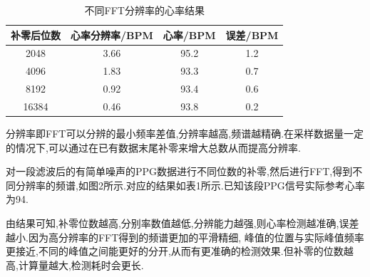 \documentclass[12pt, a4paper, oneside]{ctexart}
\begin{document}
      \begin{table}[!h]
        \renewcommand{\arraystretch}{1.3}
        \caption{不同FFT分辨率的心率结果}
        \centering 
        \begin{tabular}{cccc}
            \toprule
            补零后位数 & 心率分辨率/BPM & 心率/BPM & 误差/BPM  \\
            \midrule
            2048 & 3.66 & 95.2 & 1.2 \\
            4096 & 1.83 & 93.3 & 0.7\\
            8192 & 0.92 & 93.4 & 0.6\\
            16384 & 0.46 & 93.8  & 0.2\\
            \bottomrule
        \end{tabular}
    \end{table}

    分辨率即FFT可以分辨的最小频率差值,分辨率越高,频谱越精确.在采样数据量一定的情况下,可以通过在已有数据末尾补零来增大总数从而提高分辨率.

      对一段滤波后的有简单噪声的PPG数据进行不同位数的补零,然后进行FFT,得到不同分辨率的频谱,如图2所示.对应的结果如表1所示.已知该段PPG信号实际参考心率为94.


    由结果可知,补零位数越高,分别率数值越低,分辨能力越强,则心率检测越准确,误差越小.因为高分辨率的FFT得到的频谱更加的平滑精细,
    峰值的位置与实际峰值频率更接近,不同的峰值之间能更好的分开,从而有更准确的检测效果.但补零的位数越高,计算量越大,检测耗时会更长.
\end{document}
